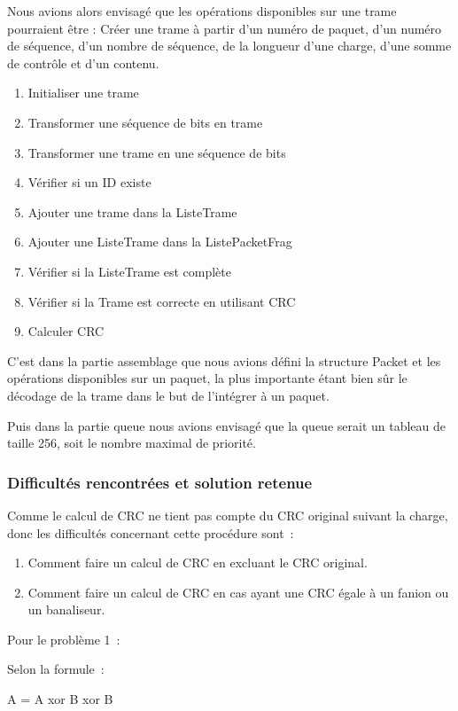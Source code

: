 \documentclass[a4paper,11pt]{article}
\begin{document}
Nous avions alors envisagé que les opérations disponibles sur une trame pourraient être :
Créer une trame à partir d'un numéro de paquet, d'un numéro de séquence, d'un nombre de séquence, de la longueur d'une charge, d'une somme de contrôle et d'un contenu.
\begin{enumerate}
 \item Initialiser une trame
 \item Transformer une séquence de bits en trame
 \item Transformer une trame en une séquence de bits
 \item Vérifier si un ID existe
 \item Ajouter une trame dans la ListeTrame
 \item Ajouter une ListeTrame dans la ListePacketFrag
 \item Vérifier si la ListeTrame est complète
 \item Vérifier si la Trame est correcte en utilisant CRC
 \item Calculer CRC
\end{enumerate}

C'est dans la partie assemblage que nous avions défini la structure Packet et les opérations disponibles sur un paquet, la plus importante étant bien sûr le décodage de la trame dans le but de l'intégrer à un paquet.

Puis dans la partie queue nous avions envisagé que la queue serait un tableau de taille 256, soit le nombre maximal de priorité. 

\subsubsection{Difficultés rencontrées et solution retenue}

Comme le calcul de CRC ne tient pas compte du CRC original suivant la charge, donc les difficultés concernant cette procédure sont :
\begin{enumerate}
 \item Comment faire un calcul de CRC en excluant le CRC original.
 \item Comment faire un calcul de CRC en cas ayant une CRC égale à un fanion ou un banaliseur.
\end{enumerate}


\vspace{0.5cm}

Pour le problème 1 :

Selon la formule :

A = A xor B xor B
\end{document}
